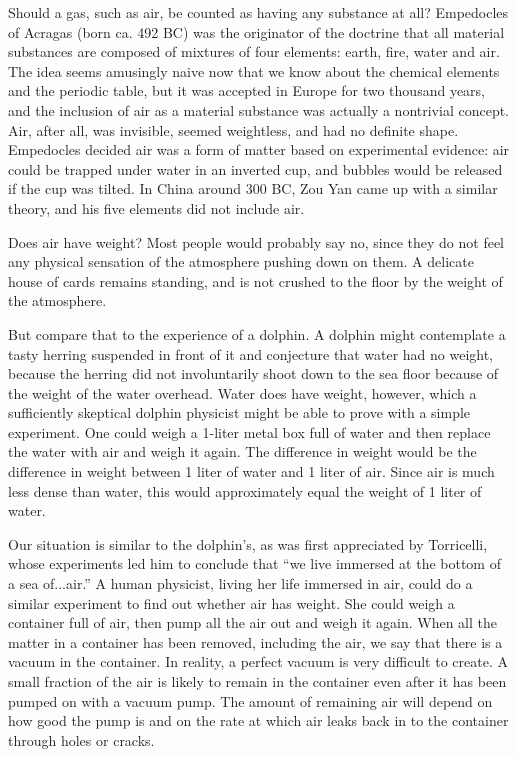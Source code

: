 Should a gas, such as air, be counted as having any
substance at all?  Empedocles of Acragas (born ca. 492 BC)
was the originator of the doctrine that all material
substances are composed of mixtures of four elements: earth,
fire, water and air.  The idea seems amusingly naive now
that we know about the chemical elements and the periodic
table, but it was accepted in Europe for two thousand years,
and the inclusion of air as a material substance was
actually a nontrivial concept.  Air, after all, was
invisible, seemed weightless, and had no definite shape. 
Empedocles decided air was a form of matter based on
experimental evidence: air could be trapped under water in
an inverted cup, and bubbles would be released if the cup
was tilted.  In China around
300 BC, Zou Yan came up with a similar theory, and his five
elements did not include air.

Does air have weight?  Most people would probably say no,
since they do not feel any physical sensation of the
atmosphere pushing down on them.  A delicate house of cards
remains standing, and is not crushed to the floor by the
weight of the atmosphere.

But compare that to the experience of a dolphin.  A
dolphin might contemplate a tasty herring suspended in front
of it and conjecture that water had no weight, because the
herring did not involuntarily shoot down to the sea floor
because of the weight of the water overhead.  Water does
have weight, however, which a sufficiently skeptical dolphin
physicist might be able to prove with a simple experiment. 
One could weigh a 1-liter metal box full of water and then
replace the water with air and weigh it again.  The
difference in weight would be the difference in weight
between 1 liter of water and 1 liter of air.  Since air
is much less dense than water, this would approximately
equal the weight of 1 liter of water.

Our situation is similar to the dolphin's, as was first
appreciated by Torricelli, whose experiments led him to
conclude that ``we live immersed at the bottom of a sea
of...air.''  A human physicist, living her life immersed in
air, could do a similar experiment to find out whether air
has weight.  She could weigh a container full of air, then
pump all the air out and weigh it again.  When all the
matter in a container has been removed, including the air,
we say that there is a vacuum in the container.   In
reality, a perfect vacuum is very difficult to create.  A
small fraction of the air is likely to remain in the
container even after it has been pumped on with a vacuum
pump.  The amount of remaining air will depend on how good
the pump is and on the rate at which air leaks back in to
the container through holes or cracks.

